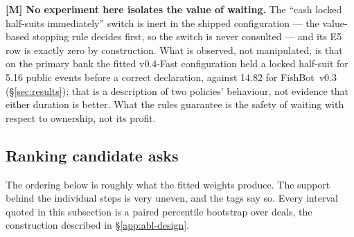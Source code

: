 \documentclass[11pt]{article}
\theoremstyle{definition}
\DeclareRobustCommand{\vfast}{\texorpdfstring{\mbox{v0.4-Fast}}{v0.4-Fast}}
\DeclareRobustCommand{\vthree}{\texorpdfstring{\mbox{FishBot v0.3}}{FishBot v0.3}}
\newcommand{\numLockHoldFour}{5.16}
\newcommand{\numLockHoldThree}{14.82}
\begin{document}
\textbf{[M] No experiment here isolates the value of waiting.} The
``cash locked half-suits immediately'' switch is inert in the shipped
configuration --- the value-based stopping rule decides first, so the switch is
never consulted --- and its E5 row is exactly zero by construction. What is
observed, not manipulated, is that on the primary bank the fitted \vfast{}
configuration held a locked half-suit for \numLockHoldFour{} public events
before a correct declaration, against \numLockHoldThree{} for \vthree{}
(\S\ref{sec:results}); that is a description of two policies' behaviour, not
evidence that either duration is better. What the rules guarantee is the safety
of waiting with respect to ownership, not its profit.

\subsection{Ranking candidate asks}
\label{app:human-rank}

The ordering below is roughly what the fitted weights produce. The support
behind the individual steps is very uneven, and the tags say so. Every interval
quoted in this subsection is a paired percentile bootstrap over deals, the
construction described in \S\ref{app:abl-design}.
\end{document}
